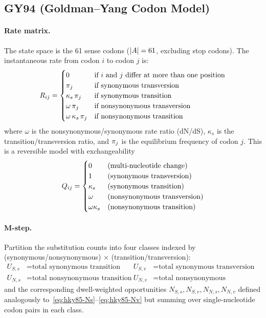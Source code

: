 \subsection{GY94 (Goldman--Yang Codon Model)}
\label{sec:mstep-gy94}

\paragraph{Rate matrix.}
The state space is the 61 sense codons ($|A| = 61$,
excluding stop codons).
The instantaneous rate from codon $i$ to codon $j$ is:
\[
R_{ij} = \begin{cases}
  0 & \text{if $i$ and $j$ differ at more than one position} \\
  \pi_j & \text{if synonymous transversion} \\
  \kappa_s\, \pi_j & \text{if synonymous transition} \\
  \omega\, \pi_j & \text{if nonsynonymous transversion} \\
  \omega\, \kappa_s\, \pi_j & \text{if nonsynonymous transition}
\end{cases}
\]
where $\omega$ is the nonsynonymous/synonymous rate ratio (dN/dS),
$\kappa_s$ is the transition/transversion ratio,
and $\pi_j$ is the equilibrium frequency of codon $j$.
This is a reversible model with exchangeability
\[
Q_{ij} = \begin{cases}
  0 & \text{(multi-nucleotide change)} \\
  1 & \text{(synonymous transversion)} \\
  \kappa_s & \text{(synonymous transition)} \\
  \omega & \text{(nonsynonymous transversion)} \\
  \omega\kappa_s & \text{(nonsynonymous transition)}
\end{cases}
\]

\paragraph{M-step.}
Partition the substitution counts into four classes indexed by
(synonymous/nonsynonymous) $\times$ (transition/transversion):
\begin{align*}
U_{S,s} &= \text{total synonymous transition counts} &
U_{S,v} &= \text{total synonymous transversion counts} \\
U_{N,s} &= \text{total nonsynonymous transition counts} &
U_{N,v} &= \text{total nonsynonymous transversion counts}
\end{align*}
and the corresponding dwell-weighted opportunities $N_{S,s}, N_{S,v}, N_{N,s}, N_{N,v}$
defined analogously to~\eqref{eq:hky85-Ns}--\eqref{eq:hky85-Nv}
but summing over single-nucleotide codon pairs in each class.

